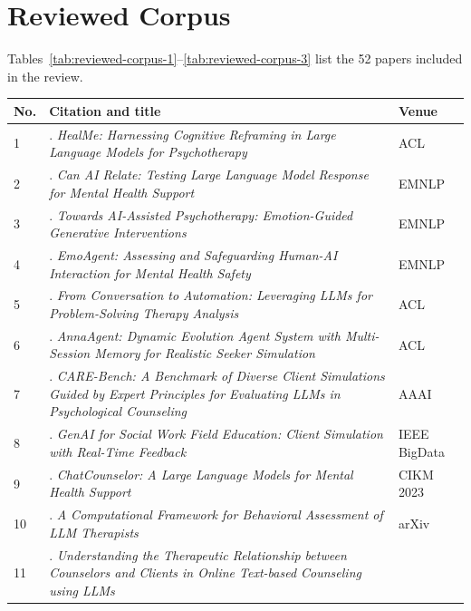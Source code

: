 \appendix

\section{Reviewed Corpus}
\label{app:corpus}

Tables~\ref{tab:reviewed-corpus-1}--\ref{tab:reviewed-corpus-3} list the 52 papers included in the review.

\begin{table}[p]
\centering
\begin{tabular}{p{0.8cm}p{11.1cm}p{3.0cm}}
\toprule
\textbf{No.} & \textbf{Citation and title} & \textbf{Venue} \\
\midrule
1 &
\citealp{Xiao2024HealMe}. \textit{HealMe: Harnessing Cognitive Reframing in Large Language Models for Psychotherapy} &
ACL \\
\midrule
2 &
\citealp{Gabriel2024Can}. \textit{Can AI Relate: Testing Large Language Model Response for Mental Health Support} &
EMNLP \\
\midrule
3 &
\citealp{Haydarov2025Towards}. \textit{Towards AI-Assisted Psychotherapy: Emotion-Guided Generative Interventions} &
EMNLP \\
\midrule
4 &
\citealp{Qiu2025EmoAgent}. \textit{EmoAgent: Assessing and Safeguarding Human-AI Interaction for Mental Health Safety} &
EMNLP \\
\midrule
5 &
\citealp{Aghakhani2025From}. \textit{From Conversation to Automation: Leveraging LLMs for Problem-Solving Therapy Analysis} &
ACL \\
\midrule
6 &
\citealp{Wang2025AnnaAgent}. \textit{AnnaAgent: Dynamic Evolution Agent System with Multi-Session Memory for Realistic Seeker Simulation} &
ACL \\
\midrule
7 &
\citealp{Wang2025CARE-Bench}. \textit{CARE-Bench: A Benchmark of Diverse Client Simulations Guided by Expert Principles for Evaluating LLMs in Psychological Counseling} &
AAAI \\
\midrule
8 &
\citealp{Sungarda2025GenAI}. \textit{GenAI for Social Work Field Education: Client Simulation with Real-Time Feedback} &
IEEE BigData \\
\midrule
9 &
\citealp{Liu2023ChatCounselor}. \textit{ChatCounselor: A Large Language Models for Mental Health Support} &
CIKM 2023 \\
\midrule
10 &
\citealp{Chiu2024A}. \textit{A Computational Framework for Behavioral Assessment of LLM Therapists} &
arXiv \\
\midrule
11 &
\citealp{Li2024Understanding}. \textit{Understanding the Therapeutic Relationship between Counselors and Clients in Online Text-based Counseling using LLMs} &

\end{tabular}
\end{table}
